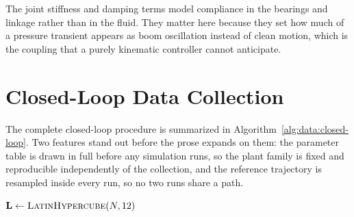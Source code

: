 The joint stiffness and damping terms model compliance in the bearings
and linkage rather than in the fluid. They matter here because they set
how much of a pressure transient appears as boom oscillation instead of
clean motion, which is the coupling that a purely kinematic
controller cannot anticipate.

\section{Closed-Loop Data Collection}
\label{sec:data:closed-loop}

The complete closed-loop procedure is summarized in
Algorithm~\ref{alg:data:closed-loop}. Two features stand out before the prose expands on them: the parameter table is
drawn in full before any simulation runs, so the plant family is fixed
and reproducible independently of the collection, and the reference
trajectory is resampled inside every run, so no two runs share a path.

\begin{algorithm}[tb]
  \small
  \DontPrintSemicolon
  \BlankLine
  $\mathbf{L}\leftarrow\textsc{LatinHypercube}(N,12)$
  \caption{Closed-loop curriculum generation.}
  \label{alg:data:closed-loop}
\end{algorithm}


